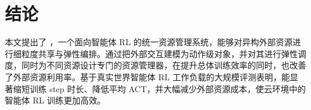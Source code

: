 \section{结论}
本文提出了 \sysname，一个面向智能体 RL 的统一资源管理系统，能够对异构外部资源进行细粒度共享与弹性编排。通过把外部交互建模为动作级对象，并对其进行弹性调度，同时为不同资源设计专门的资源管理器，\sysname 在提升总体训练效率的同时，也改善了外部资源利用率。基于真实世界智能体 RL 工作负载的大规模评测表明，\sysname 能显著缩短训练 step 时长、降低平均 ACT，并大幅减少外部资源成本，使云环境中的智能体 RL 训练更加高效。
